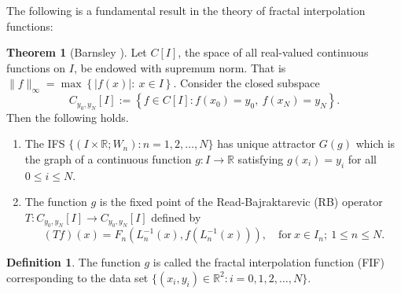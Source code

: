 \documentclass[10pt]{amsart}
\theoremstyle{definition}
\newtheorem{dfn}{Definition}[section]
\newtheorem{thm}{Theorem}[section]
\newcommand{\myseries}[3]{#1\leq #2\leq #3}
\newcommand{\norm}[2]{\lVert #1 \rVert_#2}
\begin{document}
	The following is a fundamental result in the theory of fractal interpolation functions:
	\begin{thm}[Barnsley \cite{Ftmapp}]
		Let $C[I]$, the space of all real-valued continuous functions on $I$, be endowed with supremum norm. That is $\norm{f}{\infty}=\max\left\{|f(x)|:~x\in I\right\}$. Consider the closed subspace 
		$$C_{y_0,y_N}[I]:=\left\{f\in C[I]:f(x_0)=y_0,~f(x_N)=y_N\right\}.$$
		Then the following holds.
		\begin{enumerate}
			\item The IFS $\{(I\times\mathbb{R};W_n):n=1,2,\ldots,N\}$ has unique attractor $G(g)$ which is the graph of a continuous function $g:I\rightarrow \mathbb{R}$ satisfying $g(x_i)=y_i$ for all $\myseries{0}{i}{N}$.
			\item The function $g$ is the fixed point of the Read-Bajraktarevic (RB) operator $T:C_{y_0,y_N}[I]\rightarrow C_{y_0,y_N}[I]$ defined by 
			$$(Tf)(x)=F_n(L_n^{-1}(x), f(L_n^{-1}(x))),\quad\mbox{for}~x\in I_n;~\myseries{1}{n}{N}.$$
		\end{enumerate}
		\label{ftoff}	
	\end{thm}
	\begin{dfn}
		The function $g$ is called the fractal interpolation function (FIF) corresponding to the data set $\{(x_i,y_i)\in\mathbb{R}^2:i=0,1,2,\ldots,N\}$.
	\end{dfn}
	
	
	
\end{document}
